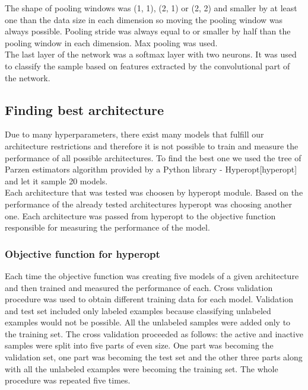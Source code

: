 \documentclass[a4paper,10pt]{report}
\begin{document}
      The shape of pooling windows was (1, 1), (2, 1) or (2, 2) and smaller by at least one than the data size in each dimension so moving the pooling window was always possible. Pooling stride was always equal to or smaller by half than the pooling window in each dimension. Max pooling was used.\\
      
      The last layer of the network was a softmax layer with two neurons. It was used to classify the sample based on features extracted by the convolutional part of the network.\\
      
	\subsection{Finding best architecture} %
	Due to many hyperparameters, there exist many models that fulfill our architecture restrictions and therefore it is not possible to train and measure the performance of all possible architectures. To find the best one we used the tree of Parzen estimators algorithm provided by a Python library - Hyperopt[hyperopt] and let it sample 20 models.\\
	
	Each architecture that was tested was choosen by hyperopt module. Based on the performance of the already tested architectures hyperopt was choosing another one. Each architecture was passed from hyperopt to the objective function responsible for measuring the performance of the model.\\
	
	\subsubsection{Objective function for hyperopt}
	Each time the objective function was creating five models of a given architecture and then trained and measured the performance of each. Cross validation procedure was used to obtain different training data for each model. Validation and test set included only labeled examples because classifying unlabeled examples would not be possible. All the unlabeled samples were added only to the training set. The cross validation proceeded as follows: the active and inactive samples were split into five parts of even size. One part was becoming the validation set, one part was becoming the test set and the other three parts along with all the unlabeled examples were becoming the training set. The whole procedure was repeated five times.\\
	
\end{document}
